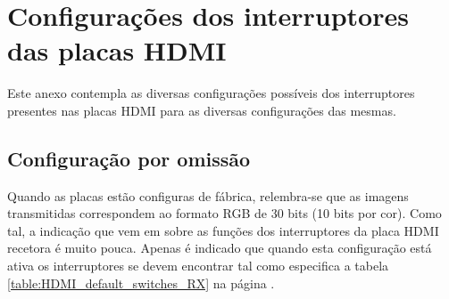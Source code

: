 {\tiny \chapter{Configurações dos interruptores das placas HDMI} \label{ap4:switches}}

Este anexo contempla as diversas configurações possíveis dos interruptores presentes nas placas HDMI para as diversas configurações das mesmas.

\section{Configuração por omissão} \label{subsubsec:HDMIconfigdefault_switches}

Quando as placas estão configuras de fábrica, relembra-se que as imagens transmitidas correspondem ao formato RGB de 30 bits (10 bits por cor). Como tal, a indicação que vem em \cite{R009} sobre as funções dos interruptores da placa HDMI recetora é muito pouca. Apenas é indicado que quando esta configuração está ativa os interruptores se devem encontrar tal como especifica a tabela \ref{table:HDMI_default_switches_RX} na página \pageref{table:HDMI_default_switches_RX}.



